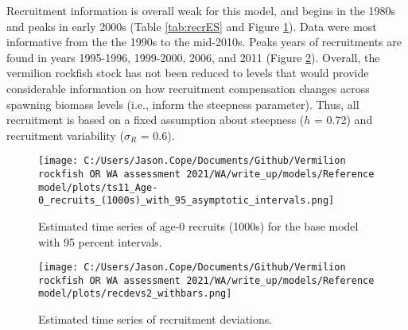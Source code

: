 \documentclass[11pt,
  english,
  a4paper,
]{article}
\begin{document}
Recruitment information is overall weak for this model, and begins in the 1980s and peaks in early 2000s (Table \ref{tab:recrES} and Figure \ref{fig:es-recruits}). Data were most informative from the the 1990s to the mid-2010s. Peaks years of recruitments are found in years 1995-1996, 1999-2000, 2006, and 2011 (Figure \ref{fig:es-rec-devs}). Overall, the vermilion rockfish stock has not been reduced to levels that would provide considerable information on how recruitment compensation changes across spawning biomass levels (i.e., inform the steepness parameter). Thus, all recruitment is based on a fixed assumption about steepness ({\(h\)\leavevmode\tagmcend\tagstructend} = 0.72) and recruitment variability ({\(\sigma_R\)\leavevmode\tagmcend\tagstructend} = 0.6).

\leavevmode\tagmcend\tagstructend\par




\begin{figure}
\centering
\texttt{[image: C:/Users/Jason.Cope/Documents/Github/Vermilion rockfish OR WA assessment 2021/WA/write\_up/models/Reference model/plots/ts11\_Age-0\_recruits\_(1000s)\_with\_95\_asymptotic\_intervals.png]}
\caption{Estimated time series of age-0 recruits (1000s) for the base model with 95 percent intervals.\label{fig:es-recruits}}
\end{figure}

\tagmcend\tagstructend


\begin{figure}
\centering
\texttt{[image: C:/Users/Jason.Cope/Documents/Github/Vermilion rockfish OR WA assessment 2021/WA/write\_up/models/Reference model/plots/recdevs2\_withbars.png]}
\caption{Estimated time series of recruitment deviations.\label{fig:es-rec-devs}}
\end{figure}

\tagmcend\tagstructend

\clearpage
\end{document}
